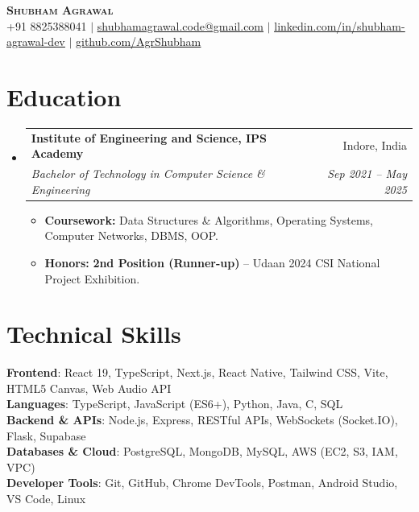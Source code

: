 \documentclass[letterpaper,11pt]{article}
\makeatletter
\newcommand{\resumeItem}[1]{
  \item\small{
    {#1 \vspace{-2pt}}
  }
}
\newcommand{\resumeSubheading}[4]{
  \vspace{-2pt}\item
    \begin{tabular*}{0.97\textwidth}[t]{l@{\extracolsep{\fill}}r}
      \textbf{#1} & #2 \\
      \textit{\small#3} & \textit{\small #4} \\
    \end{tabular*}\vspace{-7pt}
}
\newcommand{\resumeSubHeadingListStart}{\begin{itemize}[leftmargin=0.15in, label={}]}
\newcommand{\resumeSubHeadingListEnd}{\end{itemize}}
\newcommand{\resumeItemListStart}{\begin{itemize}}
\newcommand{\resumeItemListEnd}{\end{itemize}\vspace{-5pt}}
\makeatother
\begin{document}
\begin{center}
    \textbf{\Huge \scshape Shubham Agrawal} \\ \vspace{2pt}
    \small +91 8825388041 $|$ \href{mailto:shubhamagrawal.code@gmail.com}{\underline{shubhamagrawal.code@gmail.com}} $|$ 
    \href{https://linkedin.com/in/shubham-agrawal-dev}{\underline{linkedin.com/in/shubham-agrawal-dev}} $|$
    \href{https://github.com/AgrShubham}{\underline{github.com/AgrShubham}}
\end{center}

\section{Education}
  \resumeSubHeadingListStart
    \resumeSubheading
      {Institute of Engineering and Science, IPS Academy}{Indore, India}
      {Bachelor of Technology in Computer Science \& Engineering}{Sep 2021 -- May 2025}
      \resumeItemListStart
        \resumeItem{\textbf{Coursework:} Data Structures \& Algorithms, Operating Systems, Computer Networks, DBMS, OOP.}
        \resumeItem{\textbf{Honors:} \textbf{2nd Position (Runner-up)} -- Udaan 2024 CSI National Project Exhibition.}
      \resumeItemListEnd
  \resumeSubHeadingListEnd

\section{Technical Skills}
 \begin{itemize}[leftmargin=0.15in, label={}]
    \small{\item{
     \textbf{Frontend}{: React 19, TypeScript, Next.js, React Native, Tailwind CSS, Vite, HTML5 Canvas, Web Audio API} \\
     \textbf{Languages}{: TypeScript, JavaScript (ES6+), Python, Java, C, SQL} \\
     \textbf{Backend \& APIs}{: Node.js, Express, RESTful APIs, WebSockets (Socket.IO), Flask, Supabase} \\
     \textbf{Databases \& Cloud}{: PostgreSQL, MongoDB, MySQL, AWS (EC2, S3, IAM, VPC)} \\
     \textbf{Developer Tools}{: Git, GitHub, Chrome DevTools, Postman, Android Studio, VS Code, Linux}
    }}
 \end{itemize}
\end{document}
